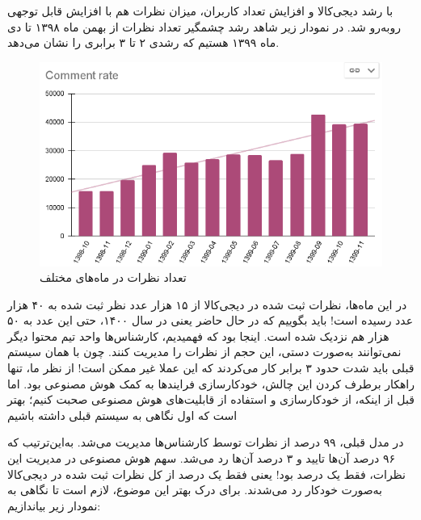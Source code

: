با رشد دیجی‌کالا و افزایش تعداد کاربران، میزان نظرات هم با افزایش قابل توجهی روبه‌رو شد. در نمودار زیر شاهد رشد چشمگیر تعداد نظرات از بهمن ماه ۱۳۹۸ تا دی ماه ۱۳۹۹ هستیم که رشدی ۲ تا ۳ برابری را نشان می‌دهد.

\begin{figure}[H]
\centering
\includegraphics[width=15cm]{figs/comment_rate.png}
\caption{تعداد نظرات در ماه‌های مختلف}\label{}
\label{fig:test}
\end{figure}

در این ماه‌ها، نظرات ثبت شده در دیجی‌کالا از ۱۵ هزار عدد نظر ثبت شده به ۴۰ هزار عدد رسیده است! باید بگوییم که در حال حاضر یعنی در سال ۱۴۰۰، حتی این عدد به ۵۰ هزار هم نزدیک شده است. اینجا بود که فهمیدیم، کارشناس‌ها واحد تیم محتوا دیگر نمی‌توانند به‌صورت دستی، این حجم از نظرات را مدیریت کنند. چون با همان سیستم قبلی باید شدت حدود ۳ برابر کار می‌کردند که این عملا غیر ممکن است!
از نظر ما، تنها راهکار برطرف کردن این چالش، خودکارسازی فرایندها به کمک هوش مصنوعی بود. اما قبل از اینکه، از خودکارسازی و استفاده از قابلیت‌های هوش مصنوعی صحبت کنیم؛ بهتر است که اول نگاهی به سیستم قبلی داشته باشیم

در مدل قبلی، ۹۹ درصد از نظرات توسط کارشناس‌ها مدیریت می‌شد. به‌این‌ترتیب که ۹۶ درصد آن‌ها تایید و ۳ درصد آن‌ها رد می‌شد. سهم هوش مصنوعی در مدیریت این نظرات، فقط یک درصد بود! یعنی فقط یک درصد از کل نظرات ثبت شده در دیجی‌کالا به‌صورت خودکار رد می‌شدند.
برای درک بهتر این موضوع، لازم است تا نگاهی به نمودار زیر بیاندازیم:

